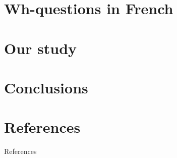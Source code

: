 \documentclass[aspectratio=169, sectionpages, codemintedoverleaf, bibref]{beamer}
\begin{document}
\section{Wh-questions in French}




\section{Our study}





\section{Conclusions}


\section{References}

\begin{frame}[allowframebreaks]{References}

%
\printbibliography


%
\end{frame}
\end{document}

